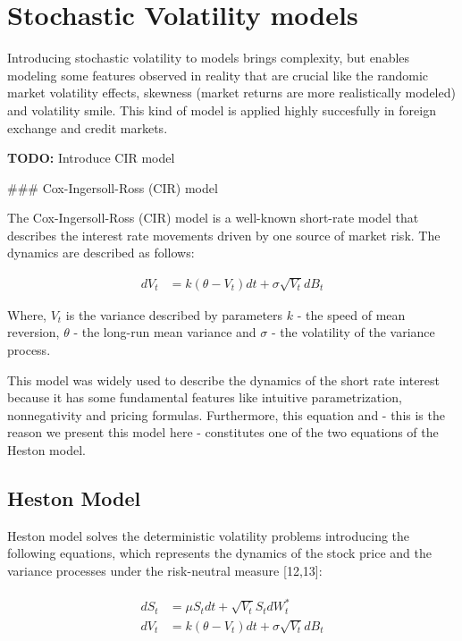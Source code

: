 \documentclass[12pt,twoside]{reedthesis}
\theoremstyle{definition}
\theoremstyle{definition}
\theoremstyle{remark}
\begin{document}
  \section{Stochastic Volatility
  models}\label{stochastic-volatility-models}
  
  Introducing stochastic volatility to models brings complexity, but
  enables modeling some features observed in reality that are crucial like
  the randomic market volatility effects, skewness (market returns are
  more realistically modeled) and volatility smile. This kind of model is
  applied highly succesfully in foreign exchange and credit markets.
  
  \textbf{TODO:} Introduce CIR model
  
  \#\#\# Cox-Ingersoll-Ross (CIR) model
  
  The Cox-Ingersoll-Ross (CIR) model is a well-known short-rate model that
  describes the interest rate movements driven by one source of market
  risk. The dynamics are described as follows:
  
  \begin{align}
  \label{eq:cir}
  dV_t &= k(\theta - V_t)dt + \sigma \sqrt{V_t} dB_t
  \end{align}
  
  \noindent
  Where, \(V_t\) is the variance described by parameters \(k\) - the speed
  of mean reversion, \(\theta\) - the long-run mean variance and
  \(\sigma\) - the volatility of the variance process.
  
  This model was widely used to describe the dynamics of the short rate
  interest because it has some fundamental features like intuitive
  parametrization, nonnegativity and pricing formulas. Furthermore, this
  equation and - this is the reason we present this model here -
  constitutes one of the two equations of the Heston model.
  
  \subsection{Heston Model}\label{heston-model}
  
  Heston model solves the deterministic volatility problems introducing
  the following equations, which represents the dynamics of the stock
  price and the variance processes under the risk-neutral measure
  {[}12,13{]}:
  
  \begin{align}
  \label{eq:heston}
  \begin{split}
  dS_t &= \mu S_t dt + \sqrt{V_t} S_t dW^*_t \\
  dV_t &= k(\theta - V_t)dt + \sigma \sqrt{V_t} dB_t
  \end{split}
  \end{align}
  
\end{document}
